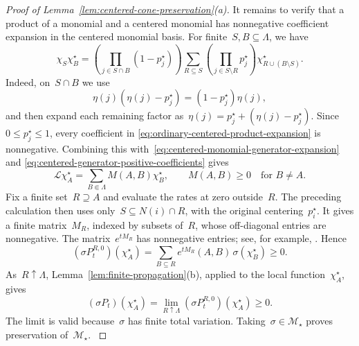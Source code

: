 \documentclass[EJP,preprint,NODS,nobera]{ejpecp}
\newcommand{\bb}[1]{\left(#1\right)}
\newcommand{\Lcal}{\mathcal{L}}
\begin{document}
\begin{proof}[Proof of Lemma~\ref{lem:centered-cone-preservation}\textup{(a)}]
It remains to verify that a product of a monomial and a centered monomial has nonnegative coefficient expansion in the centered monomial basis. For finite~$S,B\subseteq\Lambda$, we have
\begin{equation}
\label{eq:ordinary-centered-product-expansion}
\chi_S\chi_B^\star
=
\bb{\prod_{j\in S\cap B}\bb{1-p_j^\star}}
\sum_{R\subseteq S}
\bb{\prod_{j\in S\setminus R}p_j^\star}
\chi_{R\cup(B\setminus S)}^\star.
\end{equation}
Indeed, on~$S\cap B$ we use
\begin{equation*}
\eta(j)\bb{\eta(j)-p_j^\star}
=
\bb{1-p_j^\star}\eta(j),
\end{equation*}
and then expand each remaining factor as~$\eta(j)=p_j^\star+\bb{\eta(j)-p_j^\star}$. Since~$0\leq p_j^\star\leq1$, every coefficient in
\eqref{eq:ordinary-centered-product-expansion} is nonnegative. Combining this
with~\eqref{eq:centered-monomial-generator-expansion} and
\eqref{eq:centered-generator-positive-coefficients} gives
\begin{equation}
\label{eq:centered-generator-metzler}
\Lcal\chi_A^\star
=
\sum_{B\Subset\Lambda}M(A,B)\chi_B^\star,
\qquad
M(A,B)\geq0
\quad\text{for }B\neq A.
\end{equation}
{\color{red}
Fix a finite set~$R\supseteq A$ and evaluate the rates at zero outside~$R$.
The preceding calculation then uses only~$S\subseteq N(i)\cap R$, with the
original centering~$p_i^\star$. It gives a finite matrix~$M_R$, indexed by
subsets of~$R$, whose off-diagonal entries are nonnegative.
The matrix~$e^{tM_R}$ has nonnegative entries; see, for example,
\cite{ArendtEtAl1986}. Hence
\begin{equation*}
(\sigma P_t^{R,0})(\chi_A^\star)
=\sum_{B\subseteq R}e^{tM_R}(A,B)\,\sigma(\chi_B^\star)
\geq0.
\end{equation*}
As~$R\uparrow\Lambda$, Lemma~\ref{lem:finite-propagation}(b), applied to the
local function~$\chi_A^\star$, gives
\begin{equation*}
(\sigma P_t)(\chi_A^\star)
=\lim_{R\uparrow\Lambda}(\sigma P_t^{R,0})(\chi_A^\star)\geq0.
\end{equation*}
The limit is valid because~$\sigma$ has finite total variation.
Taking~$\sigma\in\mathcal M_\star$ proves preservation of~$\mathcal M_\star$.
}

\end{proof}
\end{document}
